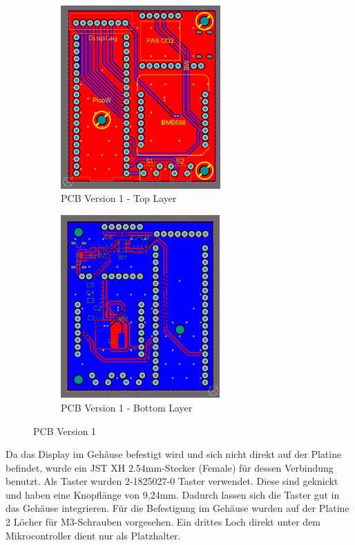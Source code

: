 \begin{inhalt}
   \begin{figure}[H] 
  \centering
  \begin{subfigure}[b]{0.48\textwidth}
    \centering
    \includegraphics[height=7cm]{files/Tobias/pics/Schaltungen/PCB/Version1_Top.PNG}
    \caption{PCB Version 1 - Top Layer}
    \label{fig:PCB_Version1_Top}
  \end{subfigure}
  \hfill
  \begin{subfigure}[b]{0.48\textwidth}
    \centering
    \includegraphics[height=7cm]{files/Tobias/pics/Schaltungen/PCB/Version1_Bottom.PNG}
    \caption{PCB Version 1 - Bottom Layer}
    \label{fig:PCB_Version1_Bot}
  \end{subfigure}
  \caption{PCB Version 1}
  \label{fig:PCB_Version_1}
\end{figure}

Da das Display im Gehäuse befestigt wird und sich nicht direkt auf der Platine befindet, wurde ein JST XH 2.54mm-Stecker (Female) für dessen Verbindung benutzt. Als Taster wurden 2-1825027-0 Taster verwendet. Diese sind geknickt und haben eine Knopflänge von 9,24mm. Dadurch lassen sich die Taster gut in das Gehäuse integrieren. Für die Befestigung im Gehäuse wurden auf der Platine 2 Löcher für M3-Schrauben vorgesehen. Ein drittes Loch direkt unter dem Mikrocontroller dient nur als Platzhalter.


\end{inhalt}

